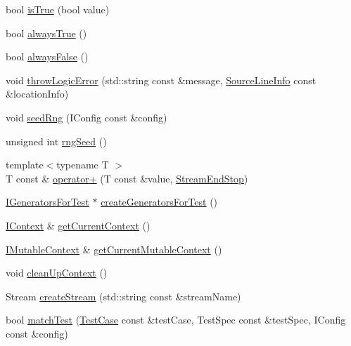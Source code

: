 \begin{DoxyCompactItemize}
\item 
bool \mbox{\hyperlink{namespace_catch_ae3bc6c6677e64e6eaa720dc3add31852}{is\+True}} (bool value)
\item 
bool \mbox{\hyperlink{namespace_catch_a129be2186a2f6546206ec52c4bf2156f}{always\+True}} ()
\item 
bool \mbox{\hyperlink{namespace_catch_ad425271249dd02956a9709e78b8b2783}{always\+False}} ()
\item 
void \mbox{\hyperlink{namespace_catch_a702b612f683d154c466ea8297ed4a20d}{throw\+Logic\+Error}} (std\+::string const \&message, \mbox{\hyperlink{struct_catch_1_1_source_line_info}{Source\+Line\+Info}} const \&location\+Info)
\item 
void \mbox{\hyperlink{namespace_catch_a161400810eb0995394d6d8d3cae821ad}{seed\+Rng}} (I\+Config const \&config)
\item 
unsigned int \mbox{\hyperlink{namespace_catch_acf5ea05e942d2d7fe79111e12754ed76}{rng\+Seed}} ()
\item 
{\footnotesize template$<$typename T $>$ }\\T const  \& \mbox{\hyperlink{namespace_catch_a5e95b3c47a7618db3649dc39b0bb9004}{operator+}} (T const \&value, \mbox{\hyperlink{struct_catch_1_1_stream_end_stop}{Stream\+End\+Stop}})
\item 
\mbox{\hyperlink{struct_catch_1_1_i_generators_for_test}{I\+Generators\+For\+Test}} $\ast$ \mbox{\hyperlink{namespace_catch_a3d93b31e88fd01ee9e0d20757ff64eab}{create\+Generators\+For\+Test}} ()
\item 
\mbox{\hyperlink{struct_catch_1_1_i_context}{I\+Context}} \& \mbox{\hyperlink{namespace_catch_ad517cca9b21deb79101e90e5508dd161}{get\+Current\+Context}} ()
\item 
\mbox{\hyperlink{struct_catch_1_1_i_mutable_context}{I\+Mutable\+Context}} \& \mbox{\hyperlink{namespace_catch_af7bb0c32ab2453d2f53e92a96d15360e}{get\+Current\+Mutable\+Context}} ()
\item 
void \mbox{\hyperlink{namespace_catch_ae50508f10ffc4ed873a31a4db4caea16}{clean\+Up\+Context}} ()
\item 
Stream \mbox{\hyperlink{namespace_catch_ad7591011c5d99d59504ecd3384001c3e}{create\+Stream}} (std\+::string const \&stream\+Name)
\item 
bool \mbox{\hyperlink{namespace_catch_aadef80fbc6bc84589777a462770cef49}{match\+Test}} (\mbox{\hyperlink{class_catch_1_1_test_case}{Test\+Case}} const \&test\+Case, Test\+Spec const \&test\+Spec, I\+Config const \&config)
\item 

\end{DoxyCompactItemize}
